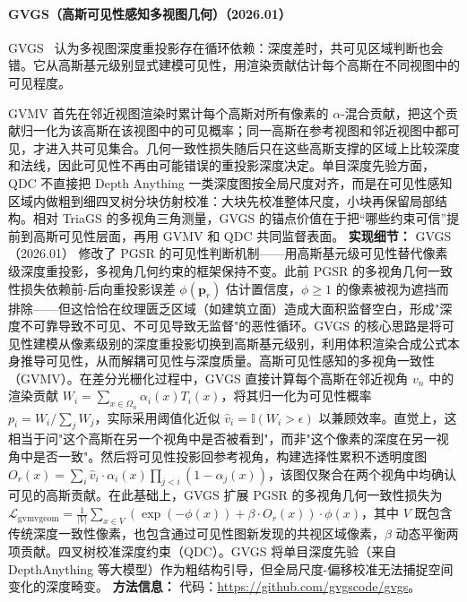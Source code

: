 \paragraph{GVGS（高斯可见性感知多视图几何）（2026.01）}
GVGS~\cite{2601_20331} 认为多视图深度重投影存在循环依赖：深度差时，共可见区域判断也会错。它从高斯基元级别显式建模可见性，用渲染贡献估计每个高斯在不同视图中的可见程度。

GVMV 首先在邻近视图渲染时累计每个高斯对所有像素的 $\alpha$-混合贡献，把这个贡献归一化为该高斯在该视图中的可见概率；同一高斯在参考视图和邻近视图中都可见，才进入共可见集合。几何一致性损失随后只在这些高斯支撑的区域上比较深度和法线，因此可见性不再由可能错误的重投影深度决定。单目深度先验方面，QDC 不直接把 Depth Anything 一类深度图按全局尺度对齐，而是在可见性感知区域内做粗到细四叉树分块仿射校准：大块先校准整体尺度，小块再保留局部结构。相对 TriaGS 的多视角三角测量，GVGS 的锚点价值在于把“哪些约束可信”提前到高斯可见性层面，再用 GVMV 和 QDC 共同监督表面。
\textbf{实现细节：} GVGS（2026.01） 修改了 PGSR 的可见性判断机制——用高斯基元级可见性替代像素级深度重投影，多视角几何约束的框架保持不变。此前 PGSR 的多视角几何一致性损失依赖前-后向重投影误差 $\phi(\bm{p}_r)$ 估计置信度，$\phi \geq 1$ 的像素被视为遮挡而排除——但这恰恰在纹理匮乏区域（如建筑立面）造成大面积监督空白，形成"深度不可靠导致不可见、不可见导致无监督"的恶性循环。GVGS 的核心思路是将可见性建模从像素级别的深度重投影切换到高斯基元级别，利用体积渲染合成公式本身推导可见性，从而解耦可见性与深度质量。高斯可见性感知的多视角一致性（GVMV）。在差分光栅化过程中，GVGS 直接计算每个高斯在邻近视角 $v_n$ 中的渲染贡献 $W_i = \sum_{x \in \Omega_n} \alpha_i(x) T_i(x)$，将其归一化为可见性概率 $p_i = W_i / \sum_j W_j$，实际采用阈值化近似 $\hat{v}_i = \mathbb{I}(W_i > \epsilon)$ 以兼顾效率。直觉上，这相当于问"这个高斯在另一个视角中是否被看到"，而非"这个像素的深度在另一视角中是否一致"。然后将可见性投影回参考视角，构建选择性累积不透明度图 $O_r(x) = \sum_i \hat{v}_i \cdot \alpha_i(x) \prod_{j<i}(1-\alpha_j(x))$，该图仅聚合在两个视角中均确认可见的高斯贡献。在此基础上，GVGS 扩展 PGSR 的多视角几何一致性损失为 $\mathcal{L}_{\mathrm{gvmvgeom}} = \frac{1}{|V|}\sum_{x \in V} (\exp(-\phi(x)) + \beta \cdot O_r(x)) \cdot \phi(x)$，其中 $V$ 既包含传统深度一致性像素，也包含通过可见性图新发现的共视区域像素，$\beta$ 动态平衡两项贡献。四叉树校准深度约束（QDC）。GVGS 将单目深度先验（来自 DepthAnything 等大模型）作为粗结构引导，但全局尺度-偏移校准无法捕捉空间变化的深度畸变。
\textbf{方法信息：} 代码：\url{https://github.com/gvgscode/gvgs}。
